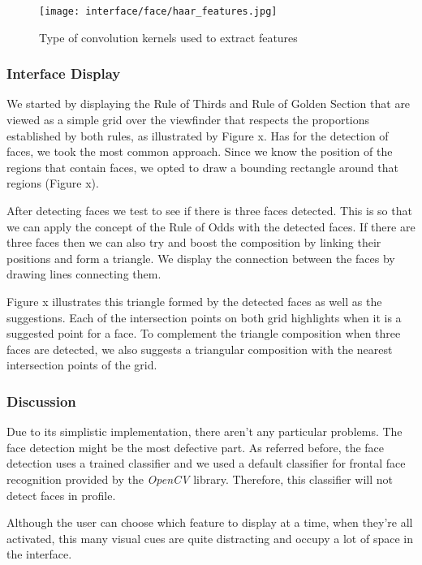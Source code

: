 \begin{figure}[htb]
	\centering
	\texttt{[image: interface/face/haar\_features.jpg]}
  	\caption{Type of convolution kernels used to extract features  }
	\label{fig:haar_features}
\end{figure}

\subsubsection{Interface Display}

We started by displaying the Rule of Thirds and Rule of Golden Section that are viewed as a simple grid over the viewfinder that respects the proportions established by both rules, as illustrated by Figure x.
Has for the detection of faces, we took the most common approach. Since we know the position of the regions that contain faces, we opted to draw a bounding rectangle around that regions (Figure x).

After detecting faces we test to see if there is three faces detected. This is so that we can apply the concept of the Rule of Odds with the detected faces. If there are three faces then we can also try and boost the composition by linking their positions and form a triangle. We display the connection between the faces by drawing lines connecting them.

Figure x illustrates this triangle formed by the detected faces as well as the suggestions. Each of the intersection points on both grid highlights when it is a suggested point for a face. To complement the triangle composition when three faces are detected, we also suggests a triangular composition with the nearest intersection points of the grid.

\subsubsection{Discussion}

Due to its simplistic implementation, there aren't any particular problems. The face detection might be the most defective part. As referred before, the face detection uses a trained classifier and we used a default classifier for frontal face recognition provided by the \emph{OpenCV} library. Therefore, this classifier will not detect faces in profile.

Although the user can choose which feature to display at a time, when they're all activated, this many visual cues are quite distracting and occupy a lot of space in the interface.

